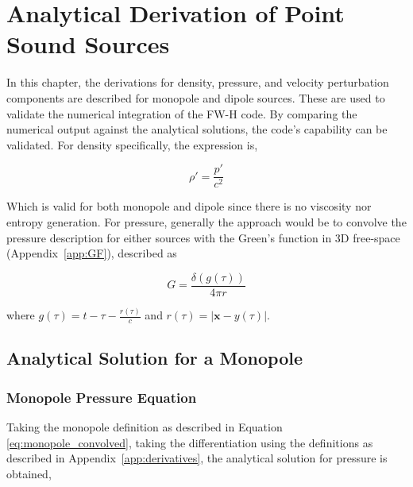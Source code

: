 \chapter{Analytical Derivation of Point Sound Sources} \label{sec:derivations}

In this chapter, the derivations for density, pressure, and velocity perturbation components are described for monopole and dipole sources. These are used to validate the numerical integration of the FW-H code. By comparing the numerical output against the analytical solutions, the code's capability can be validated. For density specifically, the expression is,

\begin{equation}
    \rho'=\frac{p'}{c^2}
    \label{eq:density}
\end{equation}

Which is valid for both monopole and dipole since there is no viscosity nor entropy generation. For pressure, generally the approach would be to convolve the pressure description for  either sources with the Green's function in 3D free-space (Appendix~\ref{app:GF}), described as

\begin{equation}
    G=\frac{\delta(g(\tau))}{4\pi r}
    \label{eq:GreensFunction}
\end{equation}

where $g(\tau)=t-\tau-\frac{r(\tau)}{c}$ and $r(\tau)=|\bm{x}-y(\tau)|$. 

\section{Analytical Solution for a Monopole} \label{subsec:Analytical Solution for a Monopole}

\subsection{Monopole Pressure Equation} \label{subsubsec:mono_p}
Taking the monopole definition as described in Equation \ref{eq:monopole_convolved}, taking the differentiation using the definitions as described in Appendix~\ref{app:derivatives}, the analytical solution for pressure is obtained,%


